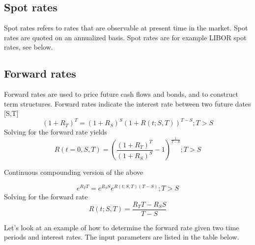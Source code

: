 \documentclass[11pt,a4paper]{article}
\numberwithin{equation}{section}
\begin{document}

	\subsection{Spot rates}
	Spot rates refers to rates that are observable at present time in the market.
	Spot rates are quoted on an annualized basis. Spot rates are for example LIBOR spot rates, see below.

	\subsection{Forward rates}
	Forward rates are used to price future cash flows and bonds, and to construct term structures. Forward rates indicate the interest rate between two future dates [S,T]
	\[
	(1+R_T)^T=(1+R_S)^S(1+R(t;S,T))^{T-S}; T>S
	\]
	Solving for the forward rate yields
	\[
	R(t=0,S,T)=\left( \frac{(1+R_T)^T}{(1+R_S)^S} - 1 \right)^{\frac{1}{T-S}};T>S
	\]

	Continuous compounding version of the above

	\[
	e^{R_TT}=e^{R_SS}e^{R(t;S,T)(T-S)};T>S
	\]
	Solving for the forward rate
	\[
	R(t;S,T)=\frac{R_TT-R_SS}{T-S}
	\]

	Let's look at an example of how to determine the forward rate given two time periods and interest rates. The input parameters are listed in the table below.

\end{document}
